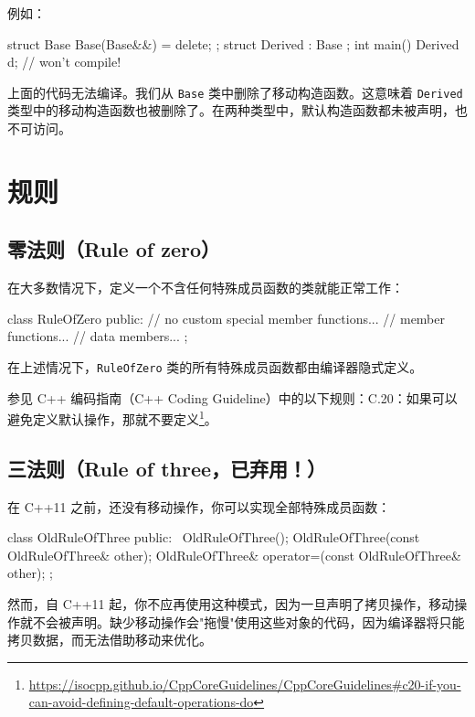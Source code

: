 例如：

\begin{codebox}[cpp]
struct Base {
Base(Base&&) = delete;
};
struct Derived : Base { };
int main() {
Derived d; // won't compile!
}
\end{codebox}

上面的代码无法编译。我们从 \texttt{Base} 类中删除了移动构造函数。这意味着 \texttt{Derived} 类型中的移动构造函数也被删除了。在两种类型中，默认构造函数都未被声明，也不可访问。

\section{规则}

\subsection{零法则（Rule of zero）}

在大多数情况下，定义一个不含任何特殊成员函数的类就能正常工作：

\begin{codebox}[cpp]
class RuleOfZero {
public:
// no custom special member functions...
// member functions...
// data members...
};
\end{codebox}

在上述情况下，\texttt{RuleOfZero} 类的所有特殊成员函数都由编译器隐式定义。

参见 C++ 编码指南（C++ Coding Guideline）中的以下规则：C.20：如果可以避免定义默认操作，那就不要定义\footnote{\url{https://isocpp.github.io/CppCoreGuidelines/CppCoreGuidelines\#c20-if-you-can-avoid-defining-default-operations-do}}。

\subsection{三法则（Rule of three，已弃用！）}

在 C++11 之前，还没有移动操作，你可以实现全部特殊成员函数：

\begin{codebox}[cpp]
class OldRuleOfThree {
public:
~OldRuleOfThree();
OldRuleOfThree(const OldRuleOfThree& other);
OldRuleOfThree& operator=(const OldRuleOfThree& other);
};
\end{codebox}

然而，自 C++11 起，你不应再使用这种模式，因为一旦声明了拷贝操作，移动操作就不会被声明。缺少移动操作会"拖慢"使用这些对象的代码，因为编译器将只能拷贝数据，而无法借助移动来优化。

